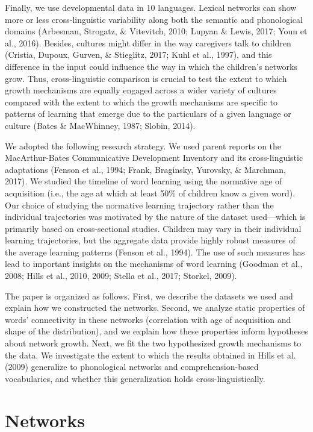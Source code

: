 \documentclass[english,,man,floatsintext]{apa6}
\begin{document}
Finally, we use developmental data in 10 languages. Lexical networks can show more or less cross-linguistic variability along both the semantic and phonological domains (Arbesman, Strogatz, \& Vitevitch, 2010; Lupyan \& Lewis, 2017; Youn et al., 2016). Besides, cultures might differ in the way caregivers talk to children (Cristia, Dupoux, Gurven, \& Stieglitz, 2017; Kuhl et al., 1997), and this difference in the input could influence the way in which the children's networks grow. Thus, cross-linguistic comparison is crucial to test the extent to which growth mechanisms are equally engaged across a wider variety of cultures compared with the extent to which the growth mechanisms are specific to patterns of learning that emerge due to the particulars of a given language or culture (Bates \& MacWhinney, 1987; Slobin, 2014).

We adopted the following research strategy. We used parent reports on the MacArthur-Bates Communicative Development Inventory and its cross-linguistic adaptations (Fenson et al., 1994; Frank, Braginsky, Yurovsky, \& Marchman, 2017). We studied the timeline of word learning using the normative age of acquisition (i.e., the age at which at least 50\% of children know a given word). Our choice of studying the normative learning trajectory rather than the individual trajectories was motivated by the nature of the dataset used---which is primarily based on cross-sectional studies. Children may vary in their individual learning trajectories, but the aggregate data provide highly robust measures of the average learning patterns (Fenson et al., 1994). The use of such measures has lead to important insights on the mechanisms of word learning (Goodman et al., 2008; Hills et al., 2010, 2009; Stella et al., 2017; Storkel, 2009).

The paper is organized as follows. First, we describe the datasets we used and explain how we constructed the networks. Second, we analyze static properties of words' connectivity in these networks (correlation with age of acquisition and shape of the distribution), and we explain how these properties inform hypotheses about network growth. Next, we fit the two hypothesized growth mechanisms to the data. We investigate the extent to which the results obtained in Hills et al. (2009) generalize to phonological networks and comprehension-based vocabularies, and whether this generalization holds cross-linguistically.

\hypertarget{networks}{%
\section{Networks}\label{networks}}
\end{document}
